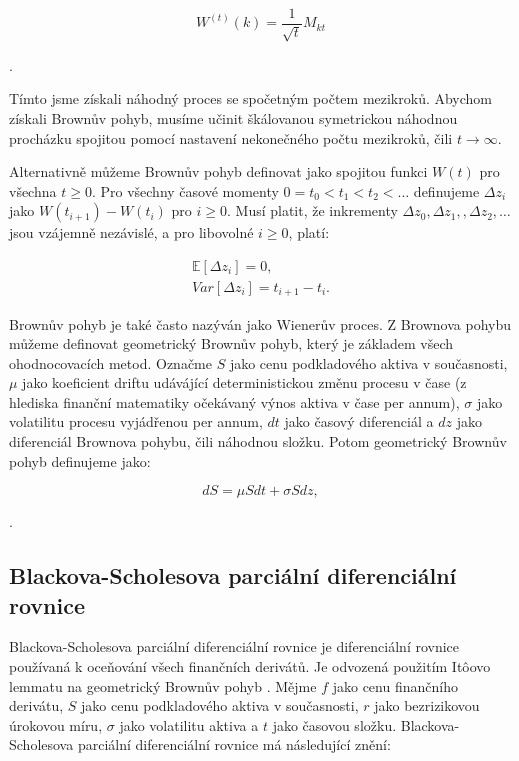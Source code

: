 \documentclass[male,czech,api_bc]{kitheses}
\begin{document}
  \begin{equation}
    \label{eq:stepped_random_walk}
    W^{(t)}(k) = \frac{1}{\sqrt{t}} M_{kt}
  \end{equation}

  \parencites[kapitola~3.2.5]{Shreve2004}.

  Tímto jsme získali náhodný proces se spočetným počtem mezikroků. Abychom získali Brownův pohyb, musíme učinit škálovanou symetrickou náhodnou procházku spojitou pomocí nastavení nekonečného počtu mezikroků, čili $t \rightarrow \infty$.

  Alternativně můžeme Brownův pohyb definovat jako spojitou funkci $W(t)$ pro všechna $t \ge 0$. Pro všechny časové momenty $0 = t_0 < t_1 < t_2 < \dots$ definujeme $\Delta z_i$ jako $W(t_{i + 1}) - W(t_i)$ pro $i \ge 0$. Musí platit, že inkrementy $\Delta z_0, \Delta z_1, ,\Delta z_2, \dots$ jsou vzájemně nezávislé, a pro libovolné $i \ge 0$, platí:

  \begin{gather}
    \mathbb{E}[\Delta z_i] = 0, \\
    Var[\Delta z_i] = t_{i+1} - t_i.
  \end{gather}

  \parencites[kapitola~3.3.1]{Shreve2004}

  Brownův pohyb je také často nazýván jako Wienerův proces. Z Brownova pohybu můžeme definovat geometrický Brownův pohyb, který je základem všech ohodnocovacích metod.
  Označme $S$ jako cenu podkladového aktiva v současnosti, $\mu$ jako koeficient driftu udávájící deterministickou změnu procesu v čase (z hlediska finanční matematiky očekávaný výnos aktiva v čase per annum), $\sigma$ jako volatilitu procesu vyjádřenou per annum, $dt$ jako časový diferenciál a $dz$ jako diferenciál Brownova pohybu, čili náhodnou složku. Potom geometrický Brownův pohyb definujeme jako:

  \begin{equation}
    dS = \mu S dt + \sigma S dz,
  \end{equation}

  \parencites[kapitola~14.3]{Hull2021}[s.~2]{Haug2007}.

  \subsection{Blackova-Scholesova parciální diferenciální rovnice}

  Blackova-Scholesova parciální diferenciální rovnice je diferenciální rovnice používaná k oceňování všech finančních derivátů. Je odvozená použitím Itôovo lemmatu na geometrický Brownův pohyb \parencites[s.~640-645]{BlackScholes1973}. 
  Mějme $f$ jako cenu finančního derivátu, $S$ jako cenu podkladového aktiva v současnosti, $r$ jako bezrizikovou úrokovou míru, $\sigma$ jako volatilitu aktiva a $t$ jako časovou složku. Blackova-Scholesova parciální diferenciální rovnice má následující znění:
\end{document}
